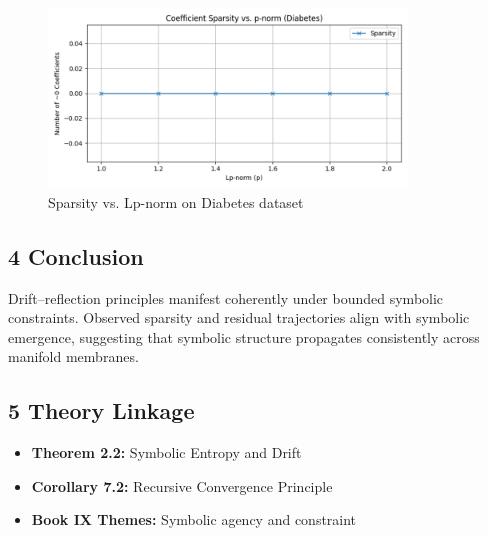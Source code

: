 \begin{figure}[htbp]
\centering
\includegraphics[width=0.85\textwidth]{srv_traces/7_sparsity_vs_p.png}
\caption{Sparsity vs. Lp-norm on Diabetes dataset}
\label{figure:trace7_sparsity_diabetes}
\end{figure}

\subsection*{4 Conclusion}
\label{subsection:trace7_conclusion}

Drift–reflection principles manifest coherently under bounded symbolic constraints. Observed sparsity and residual trajectories align with symbolic emergence, suggesting that symbolic structure propagates consistently across manifold membranes.

\subsection*{5 Theory Linkage}
\label{subsection:trace7_theory_linkage}

\begin{itemize}
    \item \textbf{Theorem 2.2:} Symbolic Entropy and Drift
    \item \textbf{Corollary 7.2:} Recursive Convergence Principle
    \item \textbf{Book IX Themes:} Symbolic agency and constraint
\end{itemize}
